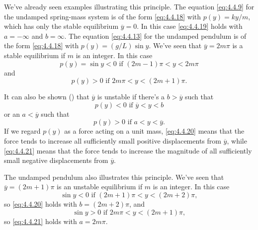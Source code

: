 We've already seen examples illustrating this principle. The equation
\eqref{eq:4.4.9} for the undamped spring-mass system is of the form
\eqref{eq:4.4.18} with $p(y)=ky/m$, which has only the stable equilibrium
$\overline y=0$. In this case \eqref{eq:4.4.19} holds with $a=-\infty$ and
$b=\infty$. The equation \eqref{eq:4.4.13} for the undamped pendulum is of
the form \eqref{eq:4.4.18} with $p(y)=(g/L)\sin y$. We've seen that
$\overline y=2m\pi$ is a stable equilibrium if $m$ is an integer. In
this case
\[
p(y)=\sin y<0
\text{ if }(2m-1)\pi<y<2m\pi
\]
and
\[
p(y)>0 \text{ if }2m\pi<y<(2m+1)\pi.
\]

It can also be shown () that $\overline y$ is
unstable if there's a $b>\overline y$ such that
\begin{equation} \label{eq:4.4.20}
p(y)<0\text{ if }\overline y<y<b
\end{equation}
or an $a<\overline y$ such that
\begin{equation} \label{eq:4.4.21}
p(y)>0\text{ if }a<y<\overline y.
\end{equation}
If we regard $p(y)$ as a force acting on a unit mass,
\eqref{eq:4.4.20} means that the force tends to increase all sufficiently
small positive displacements from $\overline y$, while \eqref{eq:4.4.21}
means that the force tends to increase the magnitude of all
sufficiently small negative displacements from $\overline y$.

The undamped pendulum also illustrates this principle. We've seen that
$\overline y=(2m+1)\pi$ is an unstable equilibrium if $m$ is an
integer. In this case
\[
\sin y<0\text{ if }(2m+1)\pi<y<(2m+2)\pi,
\]
so \eqref{eq:4.4.20} holds with $b=(2m+2)\pi$, and
\[
\sin y>0\text{ if }2m\pi<y<(2m+1)\pi,
\]
so \eqref{eq:4.4.21} holds with $a=2m\pi$.


